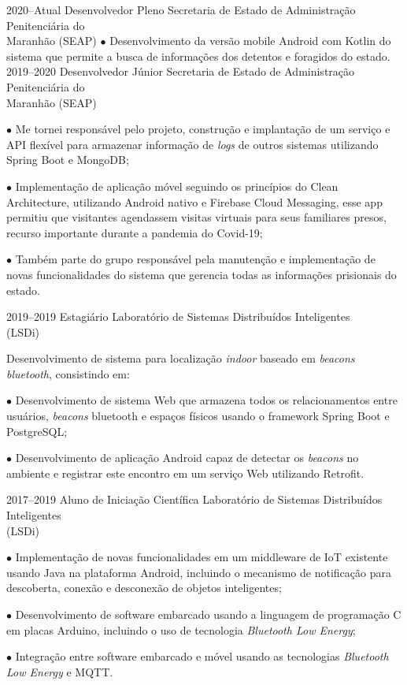 \documentclass[]{../document-class/twentysecondcv}
\begin{document}
\begin{twenty}
	\twentyitem
		{2020--Atual}
		{Desenvolvedor Pleno}
		{Secretaria de Estado de Administração Penitenciária do \\\hspace*{\fill}Maranhão (SEAP)}
		{$\bullet$ Desenvolvimento da versão mobile Android com Kotlin do sistema que permite a busca de informações dos detentos e foragidos do estado.}
	\twentyitem
		{2019--2020}
		{Desenvolvedor Júnior}
		{Secretaria de Estado de Administração Penitenciária do \\\hspace*{\fill}Maranhão (SEAP)}
		{$\bullet$ Me tornei responsável pelo projeto, construção e implantação de um serviço e API flexível para armazenar informação de \textit{logs} de outros sistemas utilizando Spring Boot e MongoDB;\vskip 4pt

		$\bullet$  Implementação de aplicação móvel seguindo os princípios do Clean Architecture, utilizando Android nativo e Firebase Cloud Messaging, esse app permitiu que visitantes agendassem visitas virtuais para seus familiares presos, recurso importante durante a pandemia do Covid-19;\vskip 4pt

		$\bullet$ Também parte do grupo responsável pela manutenção e implementação de novas funcionalidades do sistema que gerencia todas as informações prisionais do estado.}
	
	\twentyitem
		{2019--2019}
		{Estagiário}
		{Laboratório de Sistemas Distribuídos Inteligentes \\\hspace*{\fill}(LSDi)}
		{Desenvolvimento de sistema para localização \textit{indoor} baseado em \textit{beacons bluetooth}, consistindo em:\vskip 4pt
          
			$\bullet$ Desenvolvimento de sistema Web que armazena todos os relacionamentos entre usuários, \textit{beacons} bluetooth e espaços físicos usando o framework Spring Boot e PostgreSQL;\vskip 4pt
        
			$\bullet$ Desenvolvimento de aplicação Android capaz de detectar os \textit{beacons} no ambiente e registrar este encontro em um serviço Web utilizando Retrofit.}
			
	\twentyitem
		{2017--2019}
		{Aluno de Iniciação Científica}
		{Laboratório de Sistemas Distribuídos Inteligentes \\\hspace*{\fill}(LSDi)}
		{$\bullet$ Implementação de novas funcionalidades em um middleware de IoT existente usando Java na plataforma Android, incluindo o mecanismo de notificação para descoberta, conexão e desconexão de objetos inteligentes;\vskip 4pt 

			
		$\bullet$ Desenvolvimento de software embarcado usando a linguagem de programação C em placas Arduino, incluindo o uso de tecnologia \textit{Bluetooth Low Energy};\vskip 4pt 
		

		$\bullet$ Integração entre software embarcado e móvel usando as tecnologias \textit{Bluetooth Low Energy} e MQTT.}
\end{twenty}
\end{document}
